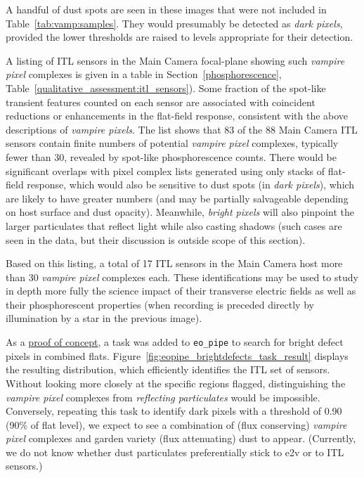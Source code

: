 A handful of dust spots are seen in these images that were not included in Table~\ref{tab:vamp:samples}. They would presumably be detected as {\it dark pixels}, provided the lower thresholds are raised to levels appropriate for their detection.


%
%

A listing of ITL sensors in the Main Camera focal-plane showing such {\it vampire pixel} complexes is given in a table in Section~\ref{phosphorescence}, Table~\ref{qualitative_assessment:itl_sensors}). Some fraction of the spot-like transient features counted on each sensor are associated with coincident reductions or enhancements in the flat-field response, consistent with the above descriptions of {\it vampire pixels}. The list shows that 83 of the 88 Main Camera ITL sensors contain finite numbers of potential {\it vampire pixel} complexes, typically fewer than 30, revealed by spot-like phosphorescence counts. There would be significant overlaps with pixel complex lists generated using only stacks of flat-field response, which would also be sensitive to dust spots (in {\it dark pixels}), which are likely to have greater numbers (and may be partially salvageable depending on host surface and dust opacity). Meanwhile, {\it bright pixels} will also pinpoint the larger particulates that reflect light while also casting shadows (such cases are seen in the data, but their discussion is outside scope of this section). 

Based on this listing, a total of 17 ITL sensors in the Main Camera host more than 30 {\it vampire pixel} complexes each. These identifications may be used to study in depth more fully the science impact of their transverse electric fields as well as their phosphorescent properties (when recording is preceded directly by illumination by a star in the previous image).

As a \href{https://rubin-obs.slack.com/archives/C07QJMQAP6E/p1731348605966989?thread_ts=1730921120.364949&cid=C07QJMQAP6E}{proof of concept}, a task was added to {\tt eo\_pipe} to search for bright defect pixels in combined flats. Figure~\ref{fig:eopipe_brightdefects_task_result} displays the resulting distribution, which efficiently identifies the ITL set of sensors. Without looking more closely at the specific regions flagged, distinguishing the {\it vampire pixel} complexes from {\it reflecting particulates} would be impossible. Conversely, repeating this task to identify dark pixels with a threshold of 0.90 (90\% of flat level), we expect to see a combination of (flux conserving) {\it vampire pixel} complexes and garden variety (flux attenuating) dust to appear. (Currently, we do not know whether dust particulates preferentially stick to e2v or to ITL sensors.)

